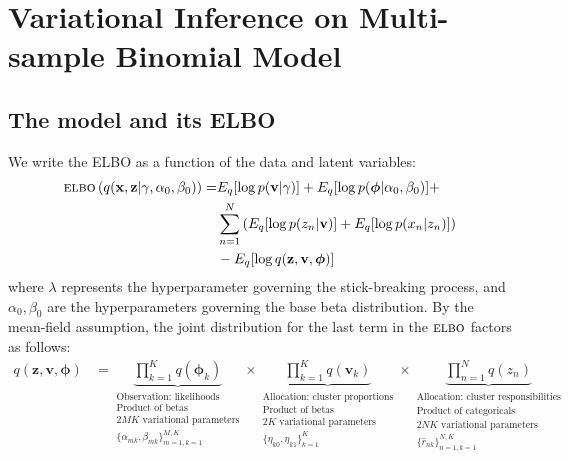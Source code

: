 \documentclass[11pt]{article}
\newcommand{\bx}{\ensuremath{\mathbf{x}}}
\newcommand{\bz}{\ensuremath{\mathbf{z}}}
\newcommand{\ELBO}{\textsc{elbo}}
\begin{document}
\section{Variational Inference on Multi-sample Binomial Model}

\subsection{The model and its ELBO}

We write the ELBO as a function of the data and latent variables:
\begin{equation}
	\begin{split}
		\ELBO\left(q(\bx, \bz | \gamma, \alpha_0, \beta_0)\right) = &E_q[\log p(\mathbf{v} | \gamma)] + E_q[ \log p(\bm{\phi} | \alpha_0, \beta_0)] + \\ &\sum\limits_{n=1}^N \left( E_q[\log p(z_n | \mathbf{v})] + E_q[\log p(x_n | z_n)]\right) \\  &- E_q[\log q(\bz, \mathbf{v}, \bm{\phi})]
	\end{split}
\end{equation}
where $\lambda$ represents the hyperparameter governing the stick-breaking process, and $\alpha_0, \beta_0$ are the hyperparameters governing the base beta distribution. By the mean-field assumption, the joint distribution for the last term in the $\ELBO$ factors as follows:
\begin{align}
    q(\bz, \mathbf{v}, \bm{\phi}) &=
\underbrace{\prod\limits_{k=1}^K q(\bm{\phi}_k)}_{\substack{\text{Observation: likelihoods}  \\  \text{Product of betas} \\ 2MK \text{ variational parameters} \\  \{\alpha_{mk}, \beta_{mk} \}_{m=1, k=1}^{M, K} }} \times
 \underbrace{\prod\limits_{k=1}^K q(\mathbf{v}_k)}_{\substack{\text{Allocation: cluster proportions} \\ \text{Product of betas} \\ 2K \text{ variational parameters}  \\ \{\eta_{k0}, \eta_{k1}\}_{k=1}^K   }} \times
 \underbrace{\prod\limits_{n=1}^{N} q(z_n)}_{\substack{ \text{Allocation: cluster responsibilities} \\ \text{Product of categoricals} \\ 2NK \text{ variational parameters}  \\ \{\hat{r}_{nk}\}_{n=1, k=1}^{N, K}   }} \nonumber
\end{align}
\end{document}
